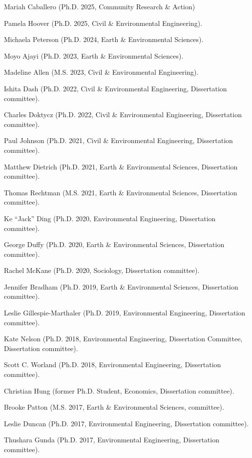 \item Mariah Caballero (Ph.D. 2025, Community Research \& Action)
\item Pamela Hoover (Ph.D. 2025, Civil \& Environmental Engineering).
\item Michaela Peterson (Ph.D. 2024, Earth \& Environmental Sciences).
\item Moyo Ajayi (Ph.D. 2023, Earth \& Environmental Sciences).
\item Madeline Allen (M.S. 2023, Civil \& Environmental Engineering).
\item Ishita Dash (Ph.D. 2022, Civil \& Environmental Engineering, Dissertation committee).
\item Charles Doktycz (Ph.D. 2022, Civil \& Environmental Engineering, Dissertation committee).
\item Paul Johnson (Ph.D. 2021, Civil \& Environmental Engineering, Dissertation committee).
\item Matthew Dietrich (Ph.D. 2021, Earth \& Environmental Sciences, Dissertation committee).
\item Thomas Rechtman (M.S. 2021, Earth \& Environmental Sciences, Dissertation committee).
\item Ke ``Jack'' Ding (Ph.D. 2020, Environmental Engineering, Dissertation committee).
\item George Duffy (Ph.D. 2020, Earth \& Environmental Sciences, Dissertation committee).
\item Rachel McKane (Ph.D. 2020, Sociology, Dissertation committee).
\item Jennifer Bradham (Ph.D. 2019, Earth \& Environmental Sciences, Dissertation committee).
\item Leslie Gillespie-Marthaler (Ph.D. 2019, Environmental Engineering, Dissertation committee).
\item Kate Nelson (Ph.D. 2018, Environmental Engineering, Dissertation Committee, Dissertation committee).
\item Scott C. Worland (Ph.D. 2018, Environmental Engineering, Dissertation committee).
\item Christian Hung (former Ph.D. Student, Economics, Dissertation committee).
\item Brooke Patton (M.S. 2017, Earth \& Environmental Sciences, committee).
\item Leslie Duncan (Ph.D. 2017, Environmental Engineering, Dissertation committee).
\item Thushara Gunda (Ph.D. 2017, Environmental Engineering, Dissertation committee).
